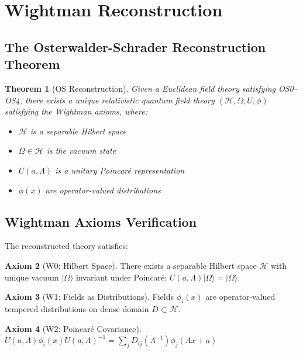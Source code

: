\documentclass[11pt,a4paper]{article}
\providecommand{\Hilbert}{\mathcal{H}}
\theoremstyle{plain}
\newtheorem{theorem}{Theorem}[section]
\theoremstyle{definition}
\newtheorem{axiom}[theorem]{Axiom}
\begin{document}
\section{Wightman Reconstruction}
\label{sec:wightman}

\subsection{The Osterwalder-Schrader Reconstruction Theorem}

\begin{theorem}[OS Reconstruction]
\label{thm:os_reconstruction}
Given a Euclidean field theory satisfying OS0--OS4, there exists a unique relativistic quantum field theory $(\Hilbert, \Omega, U, \phi)$ satisfying the Wightman axioms, where:
\begin{itemize}
\item $\Hilbert$ is a separable Hilbert space
\item $\Omega \in \Hilbert$ is the vacuum state
\item $U(a,\Lambda)$ is a unitary Poincaré representation
\item $\phi(x)$ are operator-valued distributions
\end{itemize}
\end{theorem}

\subsection{Wightman Axioms Verification}

The reconstructed theory satisfies:

\begin{axiom}[W0: Hilbert Space] 
\vspace{0.3em} 
There exists a separable Hilbert space $\Hilbert$ with unique vacuum $|\Omega\rangle$ invariant under Poincaré: $U(a,\Lambda)|\Omega\rangle = |\Omega\rangle$.
\end{axiom}
\vspace{0.3em} \vspace{0.3em} 
\begin{axiom}[W1: Fields as Distributions]
Fields $\phi_i(x)$ are operator-valued tempered distributions on dense domain $D \subset \Hilbert$.
\end{axiom}
\vspace{0.3em} 
\begin{axiom}[W2: Poincaré Covariance]
$U(a,\Lambda) \phi_i(x) U(a,\Lambda)^{-1} = \sum_j D_{ij}(\Lambda^{-1}) \phi_j(\Lambda x + a)$
\end{axiom}
\end{document}
